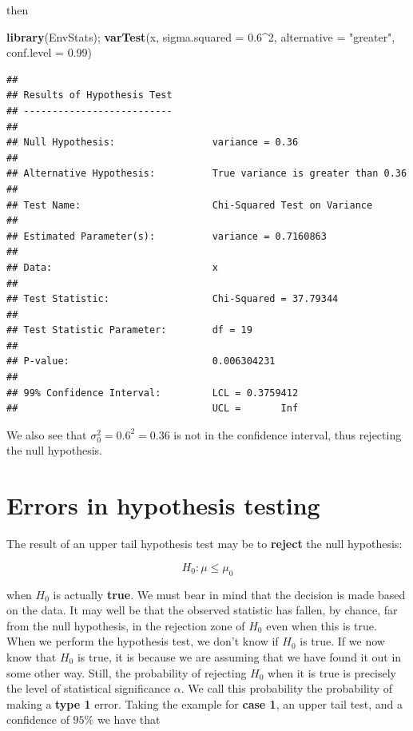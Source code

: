 \documentclass[
]{book}
\newenvironment{Shaded}{\begin{snugshade}}{\end{snugshade}}
\newcommand{\AttributeTok}[1]{\textcolor[rgb]{0.13,0.29,0.53}{#1}}
\newcommand{\DecValTok}[1]{\textcolor[rgb]{0.00,0.00,0.81}{#1}}
\newcommand{\FloatTok}[1]{\textcolor[rgb]{0.00,0.00,0.81}{#1}}
\newcommand{\FunctionTok}[1]{\textcolor[rgb]{0.13,0.29,0.53}{\textbf{#1}}}
\newcommand{\NormalTok}[1]{#1}
\newcommand{\SpecialCharTok}[1]{\textcolor[rgb]{0.81,0.36,0.00}{\textbf{#1}}}
\newcommand{\StringTok}[1]{\textcolor[rgb]{0.31,0.60,0.02}{#1}}
\begin{document}
then

\begin{Shaded}
\begin{Highlighting}[]
\FunctionTok{library}\NormalTok{(EnvStats);}
\FunctionTok{varTest}\NormalTok{(x, }\AttributeTok{sigma.squared =} \FloatTok{0.6}\SpecialCharTok{\^{}}\DecValTok{2}\NormalTok{, }\AttributeTok{alternative =} \StringTok{"greater"}\NormalTok{, }\AttributeTok{conf.level =} \FloatTok{0.99}\NormalTok{) }
\end{Highlighting}
\end{Shaded}

\begin{verbatim}
## 
## Results of Hypothesis Test
## --------------------------
## 
## Null Hypothesis:                 variance = 0.36
## 
## Alternative Hypothesis:          True variance is greater than 0.36
## 
## Test Name:                       Chi-Squared Test on Variance
## 
## Estimated Parameter(s):          variance = 0.7160863
## 
## Data:                            x
## 
## Test Statistic:                  Chi-Squared = 37.79344
## 
## Test Statistic Parameter:        df = 19
## 
## P-value:                         0.006304231
## 
## 99% Confidence Interval:         LCL = 0.3759412
##                                  UCL =       Inf
\end{verbatim}

We also see that \(\sigma_0^2=0.6^2=0.36\) is not in the confidence interval, thus rejecting the null hypothesis.

\hypertarget{errors-in-hypothesis-testing}{%
\section{Errors in hypothesis testing}\label{errors-in-hypothesis-testing}}

The result of an upper tail hypothesis test may be to \textbf{reject} the null hypothesis:

\[H_0: \mu\leq\mu_0\]

when \(H_0\) is actually \textbf{true}. We must bear in mind that the decision is made based on the data. It may well be that the observed statistic has fallen, by chance, far from the null hypothesis, in the rejection zone of \(H_0\) even when this is true. When we perform the hypothesis test, we don't know if \(H_0\) is true. If we now know that \(H_0\) is true, it is because we are assuming that we have found it out in some other way. Still, the probability of rejecting \(H_0\) when it is true is precisely the level of statistical significance \(\alpha\). We call this probability the probability of making a \textbf{type 1} error. Taking the example for \textbf{case 1}, an upper tail test, and a confidence of \(95\%\) we have that
\end{document}

